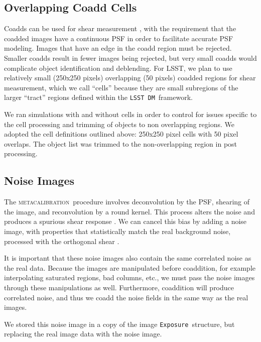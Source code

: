 \documentclass[twocolumn,twocolappendix,astrosym]{openjournal}
\newcommand{\calexp}{\texttt{Exposure}}
\newcommand{\dm}{\texttt{LSST DM}}
\newcommand{\mcal}{\textsc{metacalibration}}
\begin{document}
\subsection{Overlapping Coadd Cells} \label{sec:sim:cells}

Coadds can be used for shear measurement \citep{ArmstrongCoadd}, with the
requirement that the coadded images have a continuous PSF in order to
facilitate accurate PSF modeling.  Images that have an edge in the coadd region
must be rejected.  Smaller coadds result in fewer images being rejected, but
very small coadds would complicate object identification and deblending.  For
LSST, we plan to use relatively small (250x250 pixels) overlapping (50 pixels)
coadded regions for shear measurement, which we call ``cells'' because they are
small subregions of the larger ``tract'' regions defined within the \dm\
framework.

We ran simulations with and without cells in order to control for issues
specific to the cell processing and trimming of objects to non overlapping
regions.  We adopted the cell definitions outlined above: 250x250 pixel cells
with 50 pixel overlaps. The object list was trimmed to the non-overlapping
region in post processing.

\subsection{Noise Images} \label{sec:sim:noiseimages}

The \mcal\ procedure involves deconvolution by the PSF, shearing of the image,
and reconvolution by a round kernel.  This process alters the noise and
produces a spurious shear response \citep{SheldonMcal2017}.  We can cancel this
bias by adding a noise image, with properties that statistically match the real
background noise, processed with the orthogonal shear
\citep{SheldonMcal2017,mdet20}.

It is important that these noise images also contain the same correlated noise
as the real data.  Because the images are manipulated before coaddition, for
example interpolating saturated regions, bad columns, etc., we must pass the
noise images through these manipulations as well.  Furthermore,  coaddition
will produce correlated noise, and thus we coadd the noise fields in the same
way as the real images.

We stored this noise image in a copy of the image \calexp\ structure, but
replacing the real image data with the noise image.
\end{document}
